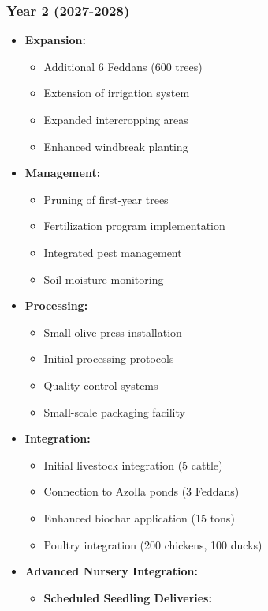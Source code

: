 \subsubsection{Year 2 (2027-2028)}
\begin{itemize}
    \item \textbf{Expansion:}
    \begin{itemize}
        \item Additional 6 Feddans (600 trees)
        \item Extension of irrigation system
        \item Expanded intercropping areas
        \item Enhanced windbreak planting
    \end{itemize}
    \item \textbf{Management:}
    \begin{itemize}
        \item Pruning of first-year trees
        \item Fertilization program implementation
        \item Integrated pest management
        \item Soil moisture monitoring
    \end{itemize}
    \item \textbf{Processing:}
    \begin{itemize}
        \item Small olive press installation
        \item Initial processing protocols
        \item Quality control systems
        \item Small-scale packaging facility
    \end{itemize}
    \item \textbf{Integration:}
    \begin{itemize}
        \item Initial livestock integration (5 cattle)
        \item Connection to Azolla ponds (3 Feddans)
        \item Enhanced biochar application (15 tons)
        \item Poultry integration (200 chickens, 100 ducks)
    \end{itemize}
    \item \textbf{Advanced Nursery Integration:}
    \begin{itemize}
        \item \textbf{Scheduled Seedling Deliveries:}

\end{itemize}
\end{itemize}
